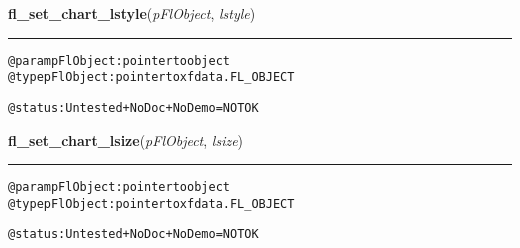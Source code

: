     \label{xformslib:flchart:fl_set_chart_lstyle}

    \vspace{0.5ex}

\hspace{.8\funcindent}\begin{boxedminipage}{\funcwidth}

    \raggedright \textbf{fl\_set\_chart\_lstyle}(\textit{pFlObject}, \textit{lstyle})

    \vspace{-1.5ex}

    \rule{\textwidth}{0.5\fboxrule}
\setlength{\parskip}{2ex}
\begin{alltt}
        @param pFlObject: pointer to object
@type pFlObject: pointer to xfdata.FL\_OBJECT

        @status: Untested + NoDoc + NoDemo = NOT OK
    
\end{alltt}

\setlength{\parskip}{1ex}
    \end{boxedminipage}

    \label{xformslib:flchart:fl_set_chart_lsize}

    \vspace{0.5ex}

\hspace{.8\funcindent}\begin{boxedminipage}{\funcwidth}

    \raggedright \textbf{fl\_set\_chart\_lsize}(\textit{pFlObject}, \textit{lsize})

    \vspace{-1.5ex}

    \rule{\textwidth}{0.5\fboxrule}
\setlength{\parskip}{2ex}
\begin{alltt}
        @param pFlObject: pointer to object
@type pFlObject: pointer to xfdata.FL\_OBJECT

        @status: Untested + NoDoc + NoDemo = NOT OK
    
\end{alltt}

\setlength{\parskip}{1ex}
    \end{boxedminipage}

